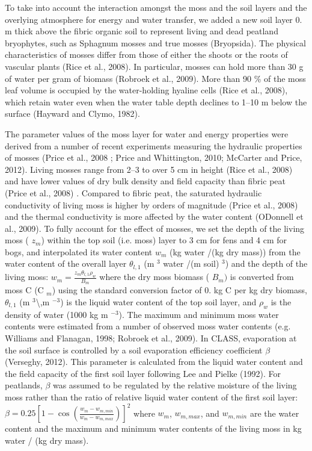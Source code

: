 \begin{DoxyEnumerate}
To take into account the interaction amongst the moss and the soil layers and the overlying atmosphere for energy and water transfer, we added a new soil layer 0. m thick above the fibric organic soil to represent living and dead peatland bryophytes, such as Sphagnum mosses and true mosses (Bryopsida). The physical characteristics of mosses differ from those of either the shoots or the roots of vascular plants (Rice et al., 2008). In particular, mosses can hold more than 30 g of water per gram of biomass (Robroek et al., 2009). More than 90 \% of the moss leaf volume is occupied by the water-\/holding hyaline cells (Rice et al., 2008), which retain water even when the water table depth declines to 1--10 m below the surface (Hayward and Clymo, 1982).

The parameter values of the moss layer for water and energy properties were derived from a number of recent experiments measuring the hydraulic properties of mosses (Price et al., 2008 \cite{Price2008-fr}; Price and Whittington, 2010; Mc\+Carter and Price, 2012). Living mosses range from 2--3 to over 5 cm in height (Rice et al., 2008) and have lower values of dry bulk density and field capacity than fibric peat (Price et al., 2008) \cite{Price2008-fr}. Compared to fibric peat, the saturated hydraulic conductivity of living moss is higher by orders of magnitude (Price et al., 2008) \cite{Price2008-fr} and the thermal conductivity is more affected by the water content (O\textquotesingle{}Donnell et al., 2009). To fully account for the effect of mosses, we set the depth of the living moss ( $z_{m}$) within the top soil (i.\+e. moss) layer to 3 cm for fens and 4 cm for bogs, and interpolated its water content $w_m$ (kg water /(kg dry mass)) from the water content of the overall layer $\theta_{l,1}$ (m $^3$ water /(m soil) $^3$) and the depth of the living moss\+: $w_m =\frac{z_m\theta_{l,1}\rho_w}{B_m} $ where the dry moss biomass ( $B_m) $ is converted from moss C (C $_m $) using the standard conversion factor of 0. kg C per kg dry biomass, $\theta _{l,1} $ (m $^3$\textbackslash{},m $^{-3}$) is the liquid water content of the top soil layer, and $\rho_w $ is the density of water (1000 kg m $^{-3} $). The maximum and minimum moss water contents were estimated from a number of observed moss water contents (e.\+g. Williams and Flanagan, 1998; Robroek et al., 2009). In C\+L\+A\+S\+S, evaporation at the soil surface is controlled by a soil evaporation efficiency coefficient $\beta $ (Verseghy, 2012). This parameter is calculated from the liquid water content and the field capacity of the first soil layer following Lee and Pielke (1992). For peatlands, $\beta $ was assumed to be regulated by the relative moisture of the living moss rather than the ratio of relative liquid water content of the first soil layer\+: $ \beta = 0.25 [ 1- \cos \left( \frac{w_m -w_{m,min}}{w_m-w_{m,max}} \right)]^{2} $ where $w_m $, $w_{m,max} $, and $w_{m,min} $ are the water content and the maximum and minimum water contents of the living moss in kg water / (kg dry mass). 
\end{DoxyEnumerate}